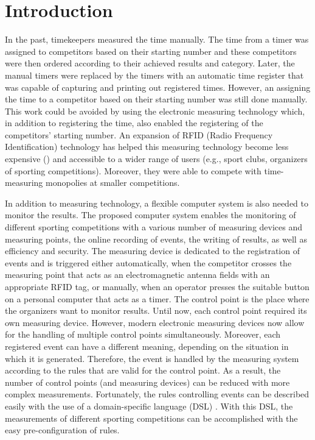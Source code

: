 \documentclass[preprint, prX]{revtex4}
\begin{document}
\maketitle

\section{Introduction}
In the past, timekeepers measured the time manually. The time from a timer was assigned to competitors based on their starting number and these competitors were then ordered according to their achieved results and category. Later, the manual timers were replaced by the timers with an automatic time register that was capable of capturing and printing out registered times. However, an assigning the time to a competitor based on their starting number was still done manually. This work could be avoided by using the electronic measuring technology which, in addition to registering the time, also enabled the registering of the competitors' starting number. An expansion of RFID (Radio Frequency Identification) technology has helped this measuring technology become less expensive (\cite{web:ChampionChip2010,web:RFID2010}) and accessible to a wider range of users (e.g., sport clubs, organizers of sporting competitions). Moreover, they were able to compete with time-measuring monopolies at smaller competitions.

In addition to measuring technology, a flexible computer system is also needed to monitor the results. The proposed computer system enables the monitoring of different sporting competitions with a various number of measuring devices and measuring points, the online recording of events, the writing of results, as well as efficiency and security. The measuring device is dedicated to the registration of events and is triggered either automatically, when the competitor crosses the measuring point that acts as an electromagnetic antenna fields with an appropriate RFID tag, or manually, when an operator presses the suitable button on a personal computer that acts as a timer. The control point is the place where the organizers want to monitor results. Until now, each control point required its own measuring device. However, modern electronic measuring devices now allow for the handling of multiple control points simultaneously. Moreover, each registered event can have a different meaning, depending on the situation in which it is generated. Therefore, the event is handled by the measuring system according to the rules that are valid for the control point. As a result, the number of control points (and measuring devices) can be reduced with more complex measurements. Fortunately, the rules controlling events can be described easily with the use of a domain-specific language (DSL) \cite{Mernik:2005}. With this DSL, the measurements of different sporting competitions can be accomplished with the easy pre-configuration of rules.
\end{document}
